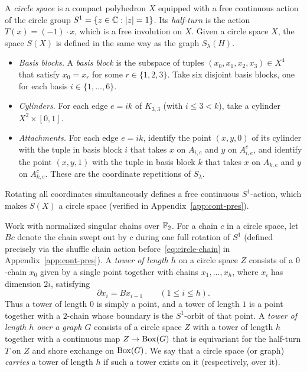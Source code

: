 A \emph{circle space} is a compact polyhedron $X$ equipped with a free continuous action of the circle group $S^1=\{z\in\mathbb C:|z|=1\}$. Its \emph{half-turn} is the action $T(x)=(-1)\cdot x$, which is a free involution on $X$. Given a circle space $X$, the space $S(X)$ is defined in the same way as the graph $S_\lambda(H)$.
\begin{itemize}
\item \emph{Basis blocks.} A \emph{basis block} is the subspace of tuples $(x_0,x_1,x_2,x_3)\in X^4$ that satisfy $x_0=x_r$ for some $r\in\{1,2,3\}$. Take six disjoint basis blocks, one for each basis $i\in\{1,\ldots,6\}$.
\item \emph{Cylinders.} For each edge $e=ik$ of $K_{3,3}$ (with $i\le3<k$), take a cylinder $X^2\times[0,1]$.
\item \emph{Attachments.} For each edge $e=ik$, identify the point $(x,y,0)$ of its cylinder with the tuple in basis block $i$ that takes $x$ on $A_{i,e}$ and $y$ on $A_{i,e}^c$, and identify the point $(x,y,1)$ with the tuple in basis block $k$ that takes $x$ on $A_{k,e}$ and $y$ on $A_{k,e}^c$. These are the coordinate repetitions of $S_\lambda$.
\end{itemize}
Rotating all coordinates simultaneously defines a free continuous $S^1$-action, which makes $S(X)$ a circle space (verified in Appendix~\ref{app:cont-pres}).

Work with normalized singular chains over $\mathbb F_2$. For a chain $c$ in a circle space, let $Bc$ denote the chain swept out by $c$ during one full rotation of $S^1$ (defined precisely via the shuffle chain action before~\eqref{eq:circle-chain} in Appendix~\ref{app:cont-pres}). A \emph{tower of length $h$} on a circle space $Z$ consists of a $0$-chain $x_0$ given by a single point together with chains $x_1,\ldots,x_h$, where $x_i$ has dimension $2i$, satisfying
\begin{equation}\label{eq:tower}
 \partial x_i=Bx_{i-1}\qquad (1\le i\le h).
\end{equation}
Thus a tower of length $0$ is simply a point, and a tower of length $1$ is a point together with a $2$-chain whose boundary is the $S^1$-orbit of that point. A \emph{tower of length $h$ over a graph $G$} consists of a circle space $Z$ with a tower of length $h$ together with a continuous map $Z\to\operatorname{Box}(G)$ that is equivariant for the half-turn $T$ on $Z$ and shore exchange on $\operatorname{Box}(G)$. We say that a circle space (or graph) \emph{carries} a tower of length $h$ if such a tower exists on it (respectively, over it).

